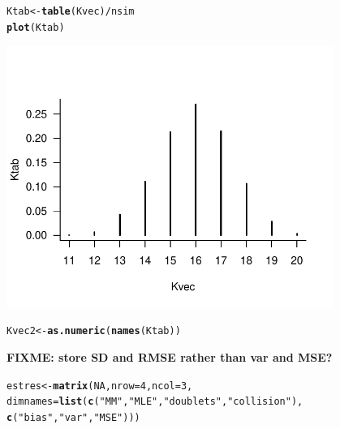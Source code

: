 \documentclass{article}\usepackage[]{graphicx}\usepackage[]{color}
\makeatletter
\newcommand{\hlnum}[1]{\textcolor[rgb]{0.686,0.059,0.569}{#1}}%
\newcommand{\hlstr}[1]{\textcolor[rgb]{0.192,0.494,0.8}{#1}}%
\newcommand{\hlopt}[1]{\textcolor[rgb]{0,0,0}{#1}}%
\newcommand{\hlstd}[1]{\textcolor[rgb]{0.345,0.345,0.345}{#1}}%
\newcommand{\hlkwb}[1]{\textcolor[rgb]{0.69,0.353,0.396}{#1}}%
\newcommand{\hlkwc}[1]{\textcolor[rgb]{0.333,0.667,0.333}{#1}}%
\newcommand{\hlkwd}[1]{\textcolor[rgb]{0.737,0.353,0.396}{\textbf{#1}}}%
\newenvironment{kframe}{%
 \def\at@end@of@kframe{}%
 \ifinner\ifhmode%
  \def\at@end@of@kframe{\end{minipage}}%
  \begin{minipage}{\columnwidth}%
 \fi\fi%
 \def\FrameCommand##1{\hskip\@totalleftmargin \hskip-\fboxsep
 \colorbox{shadecolor}{##1}\hskip-\fboxsep
     \hskip-\linewidth \hskip-\@totalleftmargin \hskip\columnwidth}%
 \MakeFramed {\advance\hsize-\width
   \@totalleftmargin\z@ \linewidth\hsize
   \@setminipage}}%
 {\par\unskip\endMakeFramed%
 \at@end@of@kframe}
\newenvironment{knitrout}{}{} %
\newcommand{\fixme}[1]{\textbf{FIXME: #1}}
\makeatother
\begin{document}
\begin{knitrout}
\color{fgcolor}\begin{kframe}
\begin{alltt}
\hlstd{Ktab} \hlkwb{<-} \hlkwd{table}\hlstd{(Kvec)}\hlopt{/}\hlstd{nsim}
\hlkwd{plot}\hlstd{(Ktab)}
\end{alltt}
\end{kframe}
\includegraphics[width=0.8\textwidth]{figure/Ktab-1} 
\begin{kframe}\begin{alltt}
\hlstd{Kvec2} \hlkwb{<-} \hlkwd{as.numeric}\hlstd{(}\hlkwd{names}\hlstd{(Ktab))}
\end{alltt}
\end{kframe}
\end{knitrout}

\fixme{store SD and RMSE rather than var and MSE?}
\begin{knitrout}
\color{fgcolor}\begin{kframe}
\begin{alltt}
\hlstd{estres} \hlkwb{<-} \hlkwd{matrix}\hlstd{(}\hlnum{NA}\hlstd{,}\hlkwc{nrow}\hlstd{=}\hlnum{4}\hlstd{,}\hlkwc{ncol}\hlstd{=}\hlnum{3}\hlstd{,}
                 \hlkwc{dimnames}\hlstd{=}\hlkwd{list}\hlstd{(}\hlkwd{c}\hlstd{(}\hlstr{"MM"}\hlstd{,}\hlstr{"MLE"}\hlstd{,}\hlstr{"doublets"}\hlstd{,}\hlstr{"collision"}\hlstd{),}
                 \hlkwd{c}\hlstd{(}\hlstr{"bias"}\hlstd{,}\hlstr{"var"}\hlstd{,}\hlstr{"MSE"}\hlstd{)))}
\end{alltt}
\end{kframe}
\end{knitrout}
\end{document}
